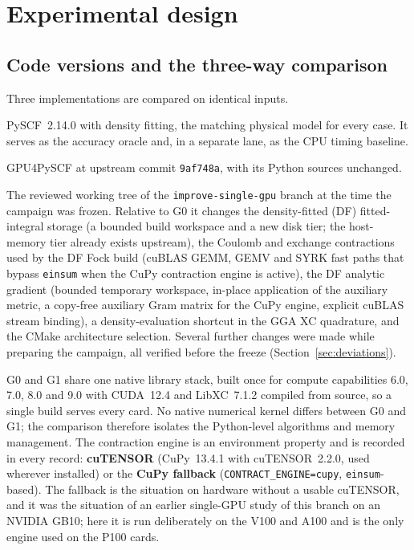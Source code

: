 \section{Experimental design}
\label{sec:methods}

\subsection{Code versions and the three-way comparison}

Three implementations are compared on identical inputs.

\begin{description}[leftmargin=1.2cm,style=nextline]
\item[\textbf{CPU}] PySCF~2.14.0 with density fitting, the matching physical model for every case. It serves as the accuracy oracle and, in a separate lane, as the CPU timing baseline.
\item[\textbf{G0 (original GPU)}] GPU4PySCF at upstream commit \texttt{9af748a}, with its Python sources unchanged.
\item[\textbf{G1 (new GPU)}] The reviewed working tree of the \texttt{improve-single-gpu} branch at the time the campaign was frozen. Relative to G0 it changes the density-fitted (DF) fitted-integral storage (a bounded build workspace and a new disk tier; the host-memory tier already exists upstream), the Coulomb and exchange contractions used by the DF Fock build (cuBLAS GEMM, GEMV and SYRK fast paths that bypass \texttt{einsum} when the CuPy contraction engine is active), the DF analytic gradient (bounded temporary workspace, in-place application of the auxiliary metric, a copy-free auxiliary Gram matrix for the CuPy engine, explicit cuBLAS stream binding), a density-evaluation shortcut in the GGA XC quadrature, and the CMake architecture selection. Several further changes were made while preparing the campaign, all verified before the freeze (Section~\ref{sec:deviations}).
\end{description}

G0 and G1 share one native library stack, built once for compute capabilities 6.0, 7.0, 8.0 and 9.0 with CUDA~12.4 and LibXC~7.1.2 compiled from source, so a single build serves every card. No native numerical kernel differs between G0 and G1; the comparison therefore isolates the Python-level algorithms and memory management. The contraction engine is an environment property and is recorded in every record: \textbf{cuTENSOR} (CuPy~13.4.1 with cuTENSOR~2.2.0, used wherever installed) or the \textbf{CuPy fallback} (\texttt{CONTRACT\_ENGINE=cupy}, \texttt{einsum}-based). The fallback is the situation on hardware without a usable cuTENSOR, and it was the situation of an earlier single-GPU study of this branch on an NVIDIA GB10; here it is run deliberately on the V100 and A100 and is the only engine used on the P100 cards.

